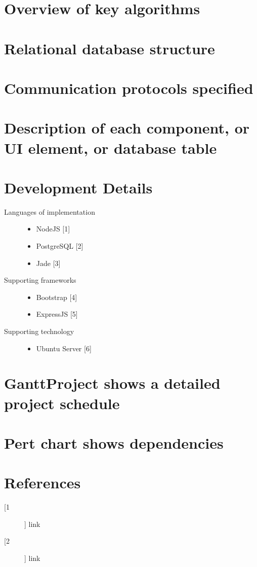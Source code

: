 \documentclass[12pt]{article}
\begin{document}
%
\section{Overview of key algorithms}

%
\section{Relational database structure}

%
\section{Communication protocols specified}

%
\section{Description of each component, or UI element, or database table}

%
\section{Development Details}
\begin{description}
  \item[Languages of implementation] \hfill
    \begin{itemize}
      \item NodeJS [1]
      \item PostgreSQL [2]
      \item Jade [3]
    \end{itemize}
  \item[Supporting frameworks] \hfill
    \begin{itemize}
      \item Bootstrap [4]
      \item ExpressJS [5]
    \end{itemize}
  \item[Supporting technology] \hfill
    \begin{itemize}
      \item Ubuntu Server [6]
    \end{itemize}
\end{description}

%
\section{GanttProject shows a detailed project schedule}

%
\section{Pert chart shows dependencies}

%
\section{References}
\begin{description}
  \item[[1]] link
  \item[[2]] link
\end{description}
\end{document}
